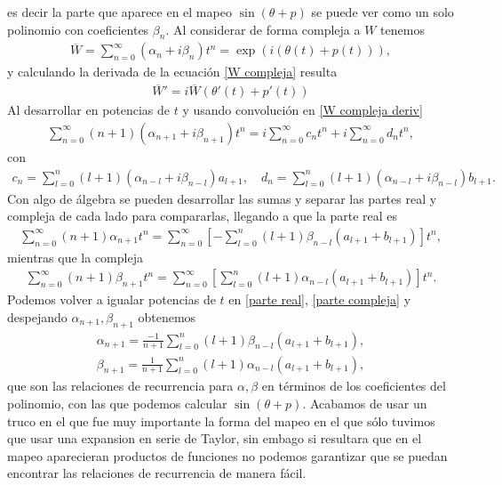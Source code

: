 es decir la parte que aparece en el mapeo $\sin(\theta+p)$ se puede ver como un solo polinomio con coeficientes $\beta_{n}$. Al considerar de forma compleja a $W$ tenemos
\begin{eqnarray}
\overline{W}=\sum_{n=0}^{\infty}(\alpha_{n}+i\beta_{n})t^{n}=\exp(i(\theta(t)+p(t))),
\label{W compleja}
\end{eqnarray}
y calculando la derivada de la ecuación \ref{W compleja} resulta
\begin{eqnarray}
\overline{W}'=i\overline{W}(\theta '(t)+p'(t))
\label{W compleja deriv}
\end{eqnarray}
Al desarrollar en potencias de $t$ y usando convolución en \ref{W compleja deriv}
\begin{eqnarray}
\sum_{n=0}^{\infty}(n+1)(\alpha_{n+1}+i\beta_{n+1})t^{n}=i\sum_{n=0}^{\infty}c_{n}t^{n}+i\sum_{n=0}^{\infty}d_{n}t^{n},
\end{eqnarray}
con
\begin{eqnarray}
c_{n}=\sum_{l=0}^{n}(l+1)(\alpha_{n-l}+i\beta_{n-l})a_{l+1}, \quad
d_{n}=\sum_{l=0}^{n}(l+1)(\alpha_{n-l}+i\beta_{n-l})b_{l+1}.
\end{eqnarray}
Con algo de álgebra se pueden desarrollar las sumas y separar las partes real y compleja de cada lado para compararlas, llegando a que la parte real es
\begin{eqnarray}
\sum_{n=0}^{\infty}(n+1)\alpha_{n+1}t^{n}=\sum_{n=0}^{\infty}\left[-\sum_{l=0}^{n}(l+1)\beta_{n-l}(a_{l+1}+b_{l+1})\right]t^{n},
\label{parte real}
\end{eqnarray}
mientras que la compleja
\begin{eqnarray}
\sum_{n=0}^{\infty}(n+1)\beta_{n+1}t^{n}=\sum_{n=0}^{\infty}\left[\sum_{l=0}^{n}(l+1)\alpha_{n-l}(a_{l+1}+b_{l+1})\right]t^{n}.
\label{parte compleja}
\end{eqnarray}
Podemos volver a igualar potencias de $t$ en \ref{parte real}, \ref{parte compleja} y despejando $\alpha_{n+1},\beta_{n+1}$ obtenemos
\begin{eqnarray}
\alpha_{n+1}=\frac{-1}{n+1}\sum_{l=0}^{n}(l+1)\beta_{n-l}(a_{l+1}+b_{l+1}),
\label{recurrencia alpha}
\end{eqnarray}
\begin{eqnarray}
\beta_{n+1}=\frac{1}{n+1}\sum_{l=0}^{n}(l+1)\alpha_{n-l}(a_{l+1}+b_{l+1}),
\label{recurrencia beta}
\end{eqnarray}
que son las relaciones de recurrencia para $\alpha,\beta$ en términos de los coeficientes del polinomio, con las que podemos calcular $\sin(\theta+p)$. Acabamos de usar un truco en el que fue muy importante la forma del mapeo en el que sólo tuvimos que usar una expansion en serie de Taylor, sin embago si resultara que en el mapeo aparecieran productos de funciones no podemos garantizar que se puedan encontrar las relaciones de recurrencia de manera fácil. \\

